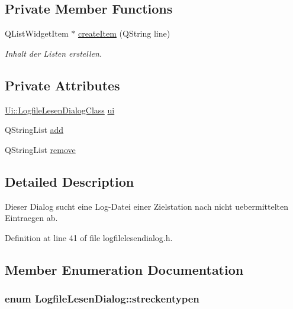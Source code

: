 \subsection*{Private Member Functions}
\begin{CompactItemize}
\item 
QListWidgetItem $\ast$ \hyperlink{class_logfile_lesen_dialog_da2f3f4ae517455882e9a2e596e7c3ed}{createItem} (QString line)
\begin{CompactList}\small\item\em Inhalt der Listen erstellen. \item\end{CompactList}\end{CompactItemize}
\subsection*{Private Attributes}
\begin{CompactItemize}
\item 
\hyperlink{class_ui_1_1_logfile_lesen_dialog_class}{Ui::LogfileLesenDialogClass} \hyperlink{class_logfile_lesen_dialog_ae3b0fc39f6af7f8fcb4b84920cacaea}{ui}
\item 
QStringList \hyperlink{class_logfile_lesen_dialog_c600d0c7f2c2e328ecdbdae3fa12bee2}{add}
\item 
QStringList \hyperlink{class_logfile_lesen_dialog_b6591a68eaf1f3c2e9b0a6422787df9d}{remove}
\end{CompactItemize}


\subsection{Detailed Description}
Dieser Dialog sucht eine Log-Datei einer Zielstation nach nicht uebermittelten Eintraegen ab. 

Definition at line 41 of file logfilelesendialog.h.

\subsection{Member Enumeration Documentation}
\hypertarget{class_logfile_lesen_dialog_f385013205b5ac8ad353d598e3ea4662}{
\subsubsection[streckentypen]{\setlength{\rightskip}{0pt plus 5cm}enum {\bf LogfileLesenDialog::streckentypen}}}
\label{class_logfile_lesen_dialog_f385013205b5ac8ad353d598e3ea4662}


